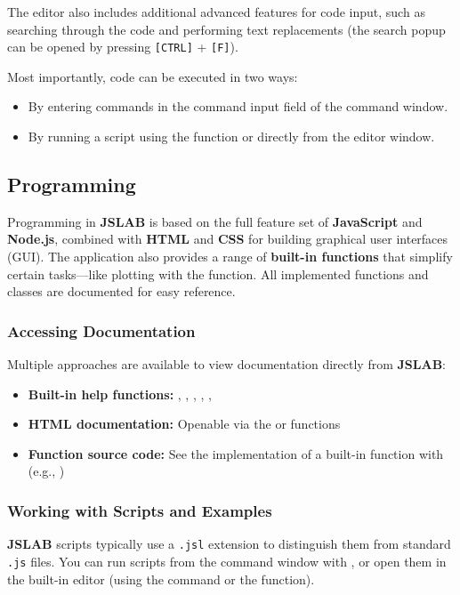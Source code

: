 \documentclass[12pt,a4paper]{article}
\begin{document}
The editor also includes additional advanced features for code input, such as searching through the code and performing text replacements (the search popup can be opened by pressing \texttt{[CTRL]} + \texttt{[F]}).

Most importantly, code can be executed in two ways:
\begin{itemize}
  \item By entering commands in the command input field of the command window.
  \item By running a script using the  function or directly from the editor window.
\end{itemize}


\subsection{Programming}
\label{sec:programming}

Programming in \textbf{JSLAB} is based on the full feature set of \textbf{JavaScript} and \textbf{Node.js}, combined with \textbf{HTML} and \textbf{CSS} for building graphical user interfaces (GUI). The application also provides a range of \textbf{built-in functions} that simplify certain tasks---like plotting with the  function. All implemented functions and classes are documented for easy reference.

\subsubsection{Accessing Documentation}
Multiple approaches are available to view documentation directly from \textbf{JSLAB}:
\begin{itemize}
  \item \textbf{Built-in help functions:} , , , , , 
  \item \textbf{HTML documentation:} Openable via the  or  functions
  \item \textbf{Function source code:} See the implementation of a built-in function with  (e.g., )
\end{itemize}

\subsubsection{Working with Scripts and Examples}
\textbf{JSLAB} scripts typically use a \texttt{.jsl} extension to distinguish them from standard \texttt{.js} files. You can run scripts from the command window with , or open them in the built-in editor (using the  command or the  function).
\end{document}
